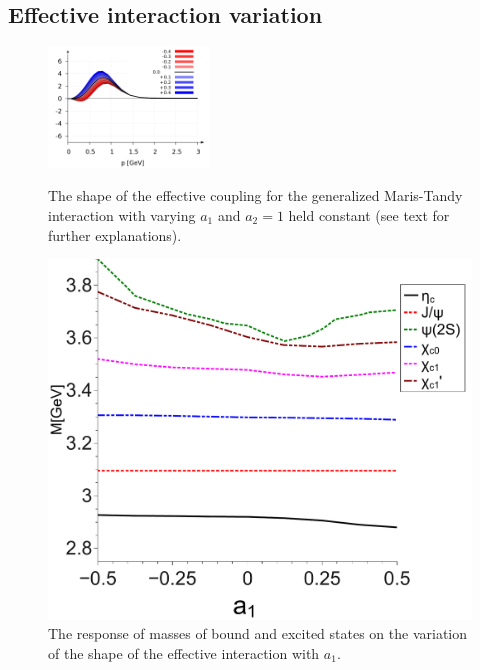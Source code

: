 \subsection{Effective interaction variation}\label{int1}
%
\begin{figure}[!t]
  \begin{center}
    \includegraphics[width=0.38\textwidth]{figures/maris_a1}
    \caption{The shape of the effective coupling for the generalized Maris-Tandy interaction 
             with varying $a_1$ and $a_2=1$ held constant (see text for further explanations).}
    \label{fig:slope_a1}
  \end{center}
  \begin{center}
    \includegraphics[scale=0.25]{figures/trend_a1_CC}
    \caption{The response of masses of bound and excited states on the variation of the shape 
             of the effective interaction with $a_1$.}
    \label{fig:trend_a1}
  \end{center}
\end{figure}
%
